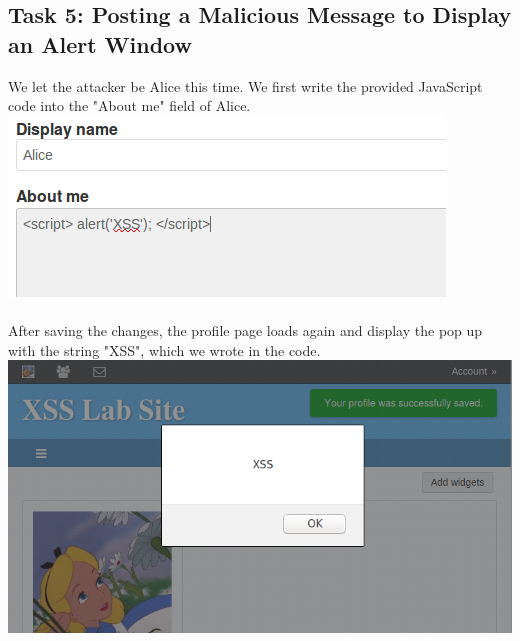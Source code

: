 \documentclass[a4paper]{article}
\begin{document}
\subsection{Task 5: Posting a Malicious Message to Display an Alert Window}
We let the attacker be Alice this time. We first write the provided JavaScript code into the "About me" field of Alice.\\
\includegraphics[scale=0.7]{2/1.png}\\\\
After saving the changes, the profile page loads again and display the pop up with the string "XSS", which we wrote in the code.\\
\includegraphics[scale=0.7]{2/2.png}\\\\
\end{document}

